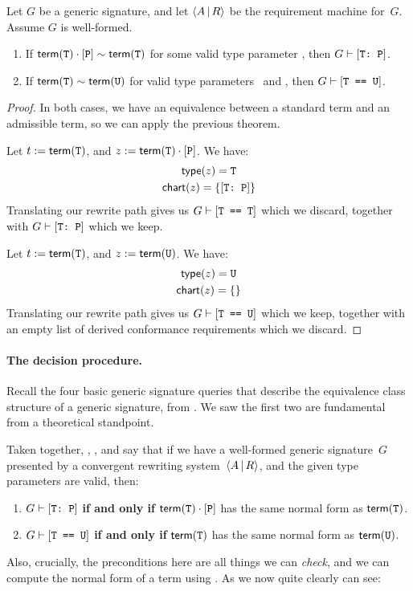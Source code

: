 \documentclass[../generics]{subfiles}
\begin{document}
\begin{corollary}\label{path to derivation swift}
Let $G$ be a generic signature, and let $\langle A\,|\,R\rangle$ be the requirement machine for~$G$. Assume $G$ is well-formed.
\begin{enumerate}
\item If $\mathsf{term}(\texttt{T})\cdot[\texttt{P}] \sim \mathsf{term}(\texttt{T})$ for some valid type parameter \tT, then $G \vdash [\texttt{T:~P}]$.
\item If $\mathsf{term}(\texttt{T}) \sim \mathsf{term}(\texttt{U})$ for valid type parameters \tT\ and \tU, then $G\vdash[\texttt{T == U}]$.
\end{enumerate}
\end{corollary}
\begin{proof}
In both cases, we have an equivalence between a standard term and an admissible term, so we can apply the previous theorem.

 Let $t := \mathsf{term}(\texttt{T})$, and $z := \mathsf{term}(\texttt{T})\cdot[\texttt{P}]$. We have:
\begin{gather*}
\mathsf{type}(z)=\texttt{T}\\
\mathsf{chart}(z) = \{[\texttt{T:~P}]\}
\end{gather*}
Translating our rewrite path gives us $G\vdash[\texttt{T == T}]$ which we discard, together with $G\vdash[\texttt{T:~P}]$ which we keep.

 Let $t := \mathsf{term}(\texttt{T})$, and $z := \mathsf{term}(\texttt{U})$. We have:
\begin{gather*}
\mathsf{type}(z) = \texttt{U}\\
\mathsf{chart}(z)=\{\}
\end{gather*}
Translating our rewrite path gives us $G\vdash[\texttt{T == U}]$ which we keep, together with an empty list of derived conformance requirements which we discard.
\end{proof}

\paragraph{The decision procedure.} Recall the four basic generic signature queries that describe the equivalence class structure of a generic signature, from . We saw the first two are fundamental from a theoretical standpoint.

Taken together, , , and  say that if we have a well-formed generic signature~$G$ presented by a convergent rewriting system~$\langle A\,|\,R\rangle$, and the given type parameters are valid, then:
\begin{enumerate}
\item $G\vdash[\texttt{T:~P}]$ \textbf{if and only if} $\mathsf{term}(\texttt{T})\cdot[\texttt{P}]$ has the same normal form as $\mathsf{term}(\texttt{T})$.
\item $G\vdash[\texttt{T == U}]$ \textbf{if and only if} $\mathsf{term}(\texttt{T})$ has the same normal form as $\mathsf{term}(\texttt{U})$.
\end{enumerate}
Also, crucially, the preconditions here are all things we can \emph{check}, and we can compute the normal form of a term using . As we now quite clearly can see:
\end{document}
